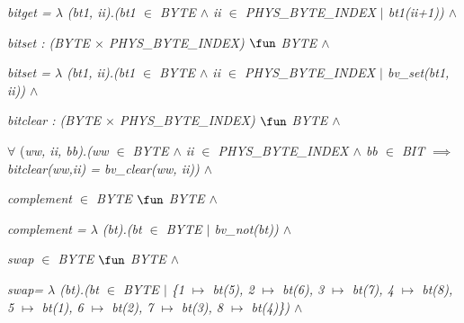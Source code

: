 \hspace*{0.20in}\it bitget \rm =  $\lambda$ \rm (\it bt1\rm , \it ii\rm )\rm .\rm (\it bt1  $\in$  \it BYTE  $\land$  \it ii  $\in$  \it PHYS\_BYTE\_INDEX  $\mid$  \it bt1\rm (\it ii\rm +\rm 1\rm )\rm )  $\land$   

\hspace*{0.20in}

\hspace*{0.20in}\it bitset \rm : \rm (\it BYTE  $\times$  \it PHYS\_BYTE\_INDEX\rm )  $\fun$  \it BYTE  $\land$  

\hspace*{0.20in}\it bitset \rm =  $\lambda$ \rm (\it bt1\rm , \it ii\rm )\rm .\rm (\it bt1  $\in$  \it BYTE  $\land$  \it ii  $\in$  \it PHYS\_BYTE\_INDEX  $\mid$  \it bv\_set\rm (\it bt1\rm , \it ii\rm )\rm )  $\land$  

\hspace*{0.20in}

\hspace*{0.20in}\it bitclear \rm : \rm (\it BYTE  $\times$  \it PHYS\_BYTE\_INDEX\rm )  $\fun$  \it BYTE  $\land$  

\hspace*{0.20in} $\forall$  \rm (\it ww\rm , \it ii\rm , \it bb\rm )\rm .\rm (\it ww  $\in$  \it BYTE  $\land$  \it ii  $\in$  \it PHYS\_BYTE\_INDEX  $\land$  \it bb  $\in$  \it BIT  $\implies$  \it bitclear\rm (\it ww\rm ,\it ii\rm ) \rm = \it bv\_clear\rm (\it ww\rm , \it ii\rm )\rm )  $\land$  

\hspace*{0.20in}

\hspace*{0.20in}\it complement  $\in$  \it BYTE  $\fun$  \it BYTE  $\land$ 

\hspace*{0.20in}\it complement \rm =  $\lambda$ \rm (\it bt\rm )\rm .\rm (\it bt  $\in$  \it BYTE  $\mid$  \it bv\_not\rm (\it bt\rm )\rm )  $\land$ 

\hspace*{0.20in}

\hspace*{0.20in}

\hspace*{0.20in}\it swap  $\in$  \it BYTE  $\fun$  \it BYTE  $\land$ 

\hspace*{0.20in}\it swap\rm = $\lambda$ \rm (\it bt\rm )\rm .\rm (\it bt $\in$ \it BYTE  $\mid$ \rm \{\rm 1 $\mapsto$ \it bt\rm (\rm 5\rm )\rm , \rm 2 $\mapsto$ \it bt\rm (\rm 6\rm )\rm , \rm 3 $\mapsto$ \it bt\rm (\rm 7\rm )\rm , \rm 4  $\mapsto$ \it bt\rm (\rm 8\rm )\rm , \rm 5 $\mapsto$ \it bt\rm (\rm 1\rm )\rm , \rm 6 $\mapsto$ \it bt\rm (\rm 2\rm )\rm , \rm 7 $\mapsto$ \it bt\rm (\rm 3\rm )\rm , \rm 8 $\mapsto$ \it bt\rm (\rm 4\rm )\rm \}\rm )  $\land$ 

